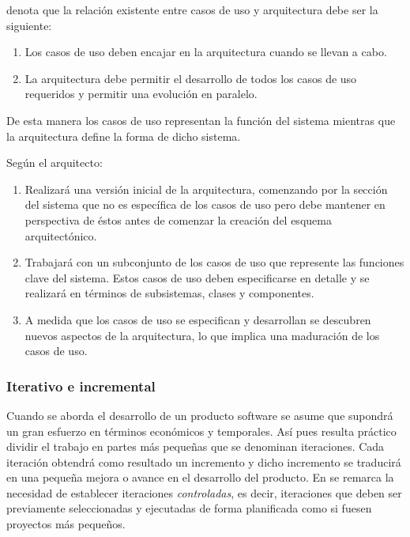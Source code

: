 \cite{rumbaugh_jacobson_pud} denota que la relación existente entre casos de uso
y arquitectura debe ser la siguiente: 

\begin{enumerate}
\item Los casos de uso deben encajar en la arquitectura cuando se llevan a cabo.

\item La arquitectura debe permitir el desarrollo de todos los casos de uso
  requeridos y permitir una evolución en paralelo. 
\end{enumerate}

De esta manera los casos de uso representan la función del sistema mientras que
la arquitectura define la forma de dicho sistema.

Según \cite{rumbaugh_jacobson_pud} el arquitecto:

\begin{enumerate}

\item Realizará una versión inicial de la arquitectura, comenzando por la sección del
  sistema que no es específica de los casos de uso pero debe mantener en
  perspectiva de éstos antes de comenzar la creación del esquema arquitectónico.

\item Trabajará con un subconjunto de los casos de uso que represente las
  funciones clave del sistema. Estos casos de uso deben especificarse en detalle y
  se realizará en términos de subsistemas, clases y componentes. 

\item A medida que los casos de uso se especifican y desarrollan se
  descubren nuevos aspectos de la arquitectura, lo que implica una maduración de
  los casos de uso. 

\end{enumerate}


\subsubsection{Iterativo e incremental}

Cuando se aborda el desarrollo de un producto software se asume que supondrá un
gran esfuerzo en términos económicos y temporales. Así pues resulta práctico
dividir el trabajo en partes más pequeñas que se denominan iteraciones. Cada
iteración obtendrá como resultado un incremento y dicho incremento se traducirá
en una pequeña mejora o avance en el desarrollo del producto. En
\cite{rumbaugh_jacobson_pud} se remarca la necesidad de establecer iteraciones
\textit{controladas}, es decir, iteraciones que deben ser previamente
seleccionadas y ejecutadas de forma planificada como si fuesen proyectos más
pequeños. 

